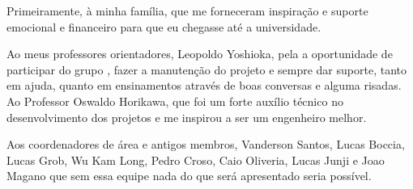 \documentclass[]{politex}
\begin{document}
\capa
\falsafolhaderosto
\folhaderosto





\begin{agradecimentos}

Primeiramente, à minha família, que me forneceram inspiração e suporte emocional e financeiro para que eu chegasse até a universidade.

Ao meus professores orientadores, Leopoldo Yoshioka, pela a oportunidade de participar do grupo , fazer a manutenção do projeto e sempre dar suporte, tanto em ajuda, quanto em ensinamentos através de boas conversas e alguma risadas. Ao Professor Oswaldo Horikawa, que foi um forte auxílio técnico no desenvolvimento dos projetos e me inspirou a ser um engenheiro melhor.

Aos coordenadores de área e antigos membros, Vanderson Santos, Lucas Boccia, Lucas Grob, Wu Kam Long, Pedro Croso, Caio Oliveria, Lucas Junji e Joao Magano que sem essa equipe nada do que será apresentado seria possível.


\end{agradecimentos}

\end{document}
